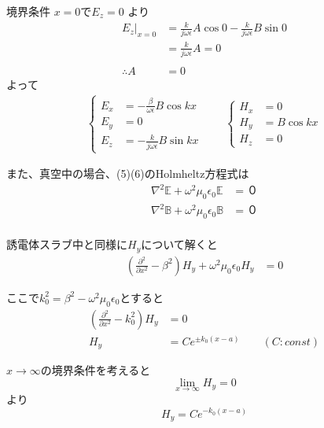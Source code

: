 \documentclass[a4paper,10pt]{bxjsarticle}
\begin{document}
境界条件 $x = 0$で$E_z = 0$ より
\begin{align*}
    E_z|_{x=0} 
        &= \frac{k}{j \omega \epsilon} A \cos 0 - \frac{k}{j \omega \epsilon} B \sin 0 \\
        &= \frac{k}{j \omega \epsilon} A = 0 \\
        \\
    \therefore A &= 0
\end{align*}
よって
\begin{align*}
    \begin{cases}
        E_x &= -\frac{\beta}{\omega \epsilon} B \cos k x \\
        E_y &= 0 \\
        E_z &= - \frac{k}{j \omega \epsilon} B \sin kx
    \end{cases} \qquad
    \begin{cases}
        H_x &= 0 \\
        H_y &= B \cos k x \\
        H_z &= 0
    \end{cases}
\end{align*}

また、真空中の場合、(5)(6)のHolmheltz方程式は
\begin{align*}
    \nabla^2 \mathbb{E} + \omega^2 \mu_0 \epsilon_0 \mathbb{E} &= ０ \\
    \nabla^2 \mathbb{B} + \omega^2 \mu_0 \epsilon_0 \mathbb{B} &= ０ \\
\end{align*}

誘電体スラブ中と同様に$H_y$について解くと
\begin{align*}
    \left( \frac{\partial^2}{\partial x^2} - \beta^2 \right) H_y + \omega^2 \mu_0 \epsilon_0 H_y &= 0
\end{align*}

ここで$k_0^2 = \beta^2 - \omega^2 \mu_0 \epsilon_0$とすると
\begin{align*}
    \left( \frac{\partial^2}{\partial x^2} - k_0^2 \right) H_y &= 0 \\
    H_y &= C e^{\pm k_0 (x - a)} \qquad ( C : const)
\end{align*}

$x \rightarrow \infty$の境界条件を考えると
$$ \lim_{x \to \infty} H_y = 0 $$ より
$$ H_y = C e^{- k_0 (x - a)} $$
\end{document}
